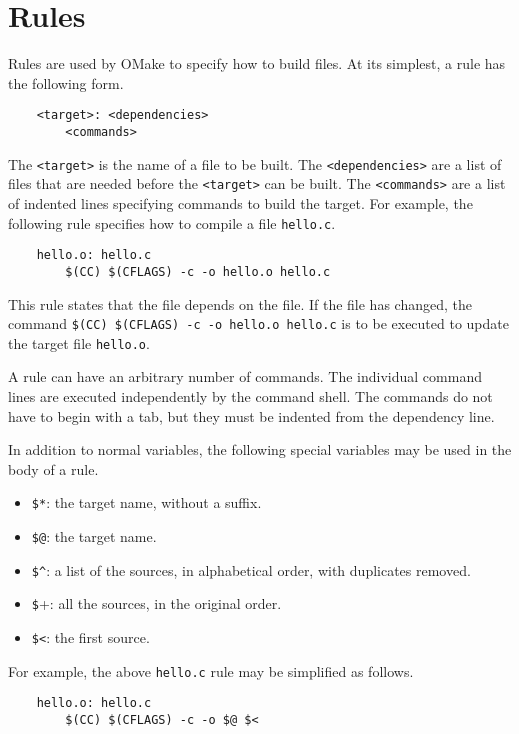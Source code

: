%
%
%
\section{Rules}

Rules are used by OMake to specify how to build files.  At its simplest, a rule has the following
form.

\begin{verbatim}
    <target>: <dependencies>
        <commands>
\end{verbatim}

The \verb+<target>+ is the name of a file to be built.  The \verb+<dependencies>+ are a list of
files that are needed before the \verb+<target>+ can be built.  The \verb+<commands>+ are a list of
indented lines specifying commands to build the target.  For example, the following rule specifies
how to compile a file \verb+hello.c+.

\begin{verbatim}
    hello.o: hello.c
        $(CC) $(CFLAGS) -c -o hello.o hello.c
\end{verbatim}

This rule states that the  file depends on the  file.  If the
 file has changed, the command \verb+$(CC) $(CFLAGS) -c -o hello.o hello.c+ is to
be executed to update the target file \verb+hello.o+.

A rule can have an arbitrary number of commands.  The individual command lines are executed
independently by the command shell.  The commands do not have to begin with a tab, but they must be
indented from the dependency line.

In addition to normal variables, the following special variables may be used in the body of a rule.

\begin{itemize}
\item \verb+$*+: the target name, without a suffix.
\item \verb+$@+: the target name.
\item \verb+$^+: a list of the sources, in alphabetical order, with
duplicates removed.
\item \verb+$++: all the sources, in the original order.
\item \verb+$<+: the first source.
\end{itemize}

For example, the above \verb+hello.c+ rule may be simplified as follows.

\begin{verbatim}
    hello.o: hello.c
        $(CC) $(CFLAGS) -c -o $@ $<
\end{verbatim}

